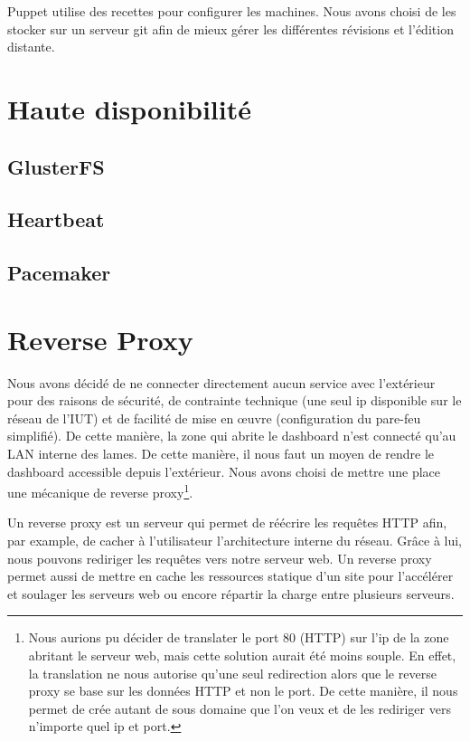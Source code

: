 \documentclass[a4paper,oneside]{report}
\begin{document}
Puppet utilise des recettes pour configurer les machines.
Nous avons choisi de les stocker sur un serveur git afin de mieux gérer les différentes révisions et l'édition distante.

\section{Haute disponibilité}
\subsection{GlusterFS}

\subsection{Heartbeat}

\subsection{Pacemaker}

\section{Reverse Proxy}
Nous avons décidé de ne connecter directement aucun service avec l'extérieur pour des raisons de sécurité, de contrainte technique (une seul ip disponible sur le réseau de l'IUT) et de facilité de mise en œuvre (configuration du pare-feu simplifié).
De cette manière, la zone qui abrite le dashboard n'est connecté qu'au LAN interne des lames.
De cette manière, il nous faut un moyen de rendre le dashboard accessible depuis l'extérieur. Nous avons choisi de mettre une place une mécanique de reverse proxy\footnote{Nous aurions pu décider de translater le port 80 (HTTP) sur l'ip de la zone abritant le serveur web, mais cette solution aurait été moins souple.
En effet, la translation ne nous autorise qu'une seul redirection alors que le reverse proxy se base sur les données HTTP et non le port. De cette manière, il nous permet de crée autant de sous domaine que l'on veux et de les rediriger vers n'importe quel ip et port.}.

Un reverse proxy est un serveur qui permet de réécrire les requêtes HTTP afin, par example, de cacher à l'utilisateur l'architecture interne du réseau.
Grâce à lui, nous pouvons rediriger les requêtes vers notre serveur web.
Un reverse proxy permet aussi de mettre en cache les ressources statique d'un site pour l'accélérer et soulager les serveurs web ou encore répartir la charge entre plusieurs serveurs.
\end{document}
